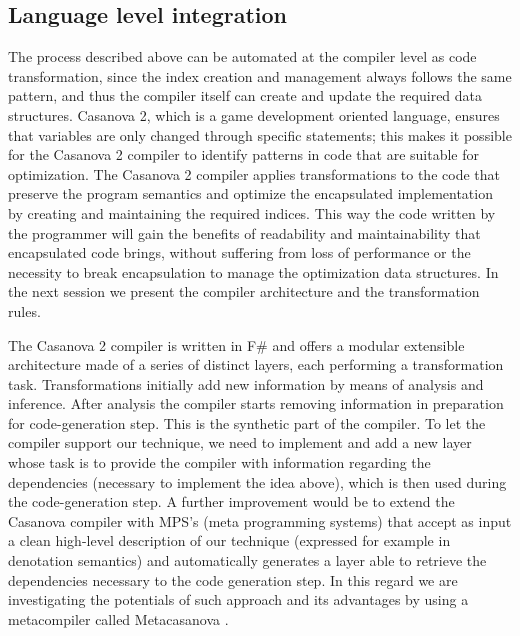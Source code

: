 \subsection{Language level integration}

The process described above can be automated at the compiler level as code transformation, since the index creation and management always follows the same pattern, and thus the compiler itself can create and update the required data structures. Casanova 2, which is a game development oriented language, ensures that variables are only changed through specific statements; this makes it possible for the Casanova 2 compiler to identify patterns in code that are suitable for optimization. The Casanova 2 compiler applies transformations to the code that preserve the program semantics and optimize the encapsulated implementation by creating and maintaining the required indices. This way the code written by the programmer will gain the benefits of readability and maintainability that encapsulated code brings, without suffering from loss of performance or the necessity to break encapsulation to manage the optimization data structures. In the next session we present the compiler architecture and the transformation rules. 

The Casanova 2 compiler is written in F\# and offers a modular extensible architecture made of a series of distinct layers, each performing a transformation task. Transformations initially add new information by means of analysis and inference. After analysis the compiler starts removing information in preparation for code-generation step. This is the synthetic part of the compiler. To let the compiler support our technique, we need to implement and add a new layer whose task is to provide the compiler with information regarding the dependencies (necessary to implement the idea above), which is then used during the code-generation step. A further improvement would be to extend the Casanova compiler with MPS's (meta programming systems)\cite{terry1987software} that accept as input a clean high-level description of our technique (expressed for example in denotation semantics) and automatically generates a layer able to retrieve the dependencies necessary to the code generation step. In this regard we are investigating the potentials of such approach and its advantages by using a metacompiler called Metacasanova \cite{meta_casanova}.